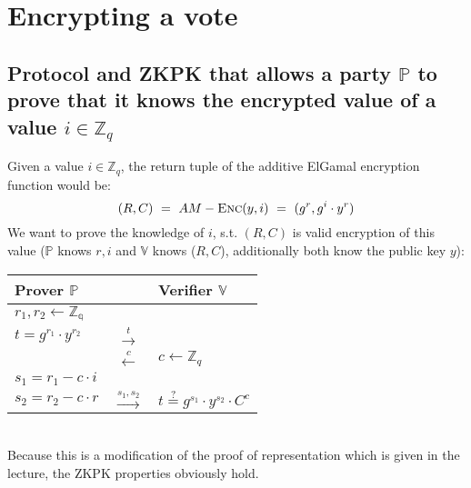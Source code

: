 \documentclass{report}
\begin{document}
	\section{Encrypting a vote}
	\startsection
		\subsection{Protocol and ZKPK that allows a party $\mathbb{P}$ to prove that it knows the encrypted value of a value $i \in \mathbb{Z}_q$}
		\startsection
			Given a value $i \in \mathbb{Z}_q$, the return tuple of the additive ElGamal encryption function would be:
			\[
				(R,C) \ = \ AM-\textsc{Enc}(y,i) \ = \ (g^r , g^i \cdot y^r)
			\]
			We want to prove the knowledge of $i$, s.t. $(R,C)$ is valid encryption of this value ($\mathbb{P}$ knows $r,i$ and $\mathbb{V}$ knows ($R,C$), additionally both know the public key $y$): \\
			\begin{center}
				\begin{tabular}{|lcl|}
					\hline
					\textbf{Prover $\mathbb{P}$} & & \textbf{Verifier $\mathbb{V}$} \\
					\hline
					$r_1, r_2 \leftarrow \mathbb{Z_q}$ && \\
					$t = g^{r_1} \cdot y^{r_2}$ & $\stackrel{t}{\rightarrow}$ & \\
					& $\stackrel{c}{\leftarrow}$ & $c \leftarrow \mathbb{Z}_q$ \\
					$s_1 = r_1 -c \cdot i$ && \\
					$s_2 = r_2 -c \cdot r$ & $\stackrel{s_1, s_2}{\rightarrow}$ & $t \stackrel{?}{=} g^{s_1} \cdot y^{s_2} \cdot C^c$ \\
					\hline
				\end{tabular}
			\end{center}
			\hfill \\
			Because this is a modification of the proof of representation which is given in the lecture, the ZKPK properties obviously hold.
		\closesection
\end{document}
